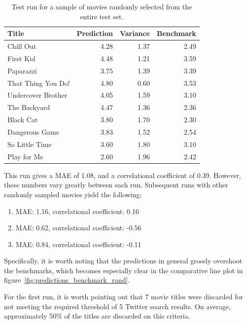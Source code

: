 \begin{table}[h]
  \begin{center}
    \begin{tabular}{|l|rr|r|}
      \hline
      \textbf{Title} & \textbf{Prediction} & \textbf{Variance} & \textbf{Benchmark} \\
      \hline
      Chill Out          & 4.28 & 1.37 & 2.49 \\
      First Kid          & 4.48 & 1.21 & 3.59 \\
      Paparazzi          & 3.75 & 1.39 & 3.39 \\
      That Thing You Do! & 4.80 & 0.60 & 3.53 \\
      Undercover Brother & 4.05 & 1.59 & 3.10 \\
      The Backyard       & 4.47 & 1.36 & 2.36 \\
      Black Cat          & 3.80 & 1.70 & 2.30 \\
      Dangerous Game     & 3.83 & 1.52 & 2.54 \\
      So Little Time     & 3.60 & 1.80 & 3.10 \\
      Play for Me        & 2.60 & 1.96 & 2.42 \\
      \hline
    \end{tabular}
  \end{center}
  \caption{Test run for a sample of movies randomly selected from the entire test set.}
  \label{tab:test_run_all}
\end{table}

This run gives a MAE of 1.08, and a correlational coefficient of 0.39. However, these numbers vary greatly between each run. Subsequent runs with other randomly sampled movies yield the following:

\begin{enumerate}
  \item MAE: 1.16, correlational coefficient: 0.16
  \item MAE: 0.62, correlational coefficient: -0.56
  \item MAE: 0.84, correlational coefficient: -0.11
\end{enumerate}

Specifically, it is worth noting that the predictions in general grossly overshoot the benchmarks, which becomes especially clear in the comparative line plot in figure~\ref{fig:predictions_benchmark_rand}.

For the first run, it is worth pointing out that 7 movie titles were discarded for not meeting the required threshold of 5 Twitter search results. On average, approximately 50\% of the titles are discarded on this criteria.

